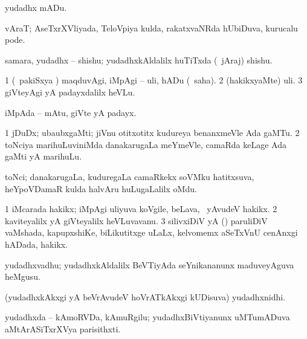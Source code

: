 {\bentry
{} 
\gl{\akirx}
\bmng
yudadhx mADu. 
\emng
\eentry

\bentry
{} 
\gl{\saMkiSx}
\expl{}
\bmng
{} 
\emng
\eentry

\bentry
{} 
\gl{\nA}
\expl{}
\bmng
vAraT; AseTxrXVliyada, TeloVpiya kulda, rakatxvaNRda hUbiDuva, kurucalu pode. 
\emng
\eentry

\bentry
{} 
\gl{\nA}
\expl{}
\bmng
samara, yudadhx -- shishu; yudadhxkAldalilx huTiTxda (\kanmu\ jAraj) shishu. 
\emng
\eentry

\bentry
{} 
\gl{\sakirx}
\expl{}
\bmng
\bnum
\num{1} (\kanmu\ pakiSxya \vi) maqduvAgi, iMpAgi -- uli, hADu (\akirx\ saha). 
\num{2} (hakikxyaMte) uli. 
\num{3} giVteyAgi yA padayxdalilx heVLu. 
\enum
\emng
\eentry

\bentry
{} 
\gl{\nA}
\expl{}
\bmng
iMpAda -- mAtu, giVte yA padayx. 
\emng
\eentry

\bentry
{} 
\gl{\nA}
\expl{}
\bmng
\bnum
\num{1} jDuDx; ubaubxgaMti; jiVnu otitxotitx kudureya benanxmeVle Ada gaMTu. 
\num{2} toNciya marihuLuviniMda danakarugaLa meYmeVle, camaRda keLage Ada gaMti yA marihuLu. 
\enum
\emng
\eentry

\bentry
{} 
\gl{\nA}
\expl{}
\bmng
toNci; danakarugaLa, kuduregaLa camaRkekx soVMku hatitxsuva, heYpoVDamaR kulda halvAru huLugaLalilx oMdu. 
\emng
\eentry

\bentry
{} 
\gl{\nA}
\expl{}
\bmng
\bnum
\num{1} iMcarada hakikx; iMpAgi uliyuva koVgile, beLava, \mo\ yAvudeV hakikx. 
\num{2} kaviteyalilx yA giVteyalilx heVLuvavanu. 
\num{3} silivxiDiV yA (\ame) paruliDiV vaMshada, kapupxshiKe, biLikutitxge uLaLx, kelvomemx aSeTxVnU cenAnxgi hADada, hakikx. 
\enum
\emng
\eentry

\bentry
{} 
\gl{\nA}
\expl{}
\bmng
yudadhxvadhu; yudadhxkAldalilx BeVTiyAda seYnikananunx maduveyAguva heMgusu. 
\emng
\eentry

\bentry
{} 
\gl{\nA}
\expl{}
\bmng
(yudadhxkAkxgi yA beVrAvudeV hoVrATkAkxgi kUDisuva) yudadhxnidhi. 
\emng
\eentry

\bentry
{} 
\gl{\nA}
\expl{}
\bmng
yudadhxda -- kAmoRVDa, kAmuRgilu; yudadhxBiVtiyanunx uMTumADuva aMtArASiTxrXVya parisithxti. 
\emng
\eentry

}
